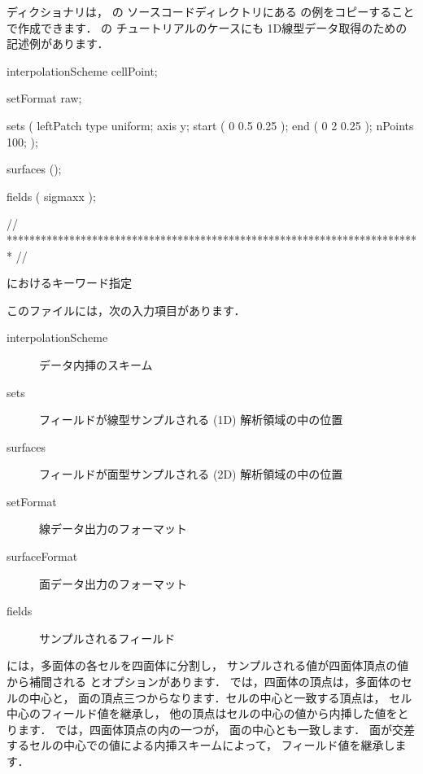 ディクショナリは，
の
ソースコードディレクトリにある
\/の例をコピーすることで作成できます．
\/の
チュートリアルのケースにも
1D線型データ取得のための記述例があります．
\begin{OFverbatim}[file, linenum=17]

interpolationScheme cellPoint;

setFormat       raw;

sets
(
    leftPatch
    {
        type    uniform;
        axis    y;
        start   ( 0 0.5 0.25 );
        end     ( 0 2 0.25 );
        nPoints 100;
    }
);

surfaces        ();

fields          ( sigmaxx );


// ************************************************************************* //
\end{OFverbatim}


\begin{table}[ht]
 
 \caption{におけるキーワード指定}
 \label{tbl:6.3}
\end{table}


このファイルには，次の入力項目があります．
\begin{description}
 \item[interpolationScheme] データ内挿のスキーム
 \item[sets] フィールドが線型サンプルされる (1D) 解析領域の中の位置
 \item[surfaces] フィールドが面型サンプルされる (2D) 解析領域の中の位置
 \item[setFormat] 線データ出力のフォーマット
 \item[surfaceFormat] 面データ出力のフォーマット
 \item[fields] サンプルされるフィールド
\end{description}

には，多面体の各セルを四面体に分割し，
サンプルされる値が四面体頂点の値から補間される
とオプションがあります．
では，四面体の頂点は，多面体のセルの中心と，
面の頂点三つからなります．セルの中心と一致する頂点は，
セル中心のフィールド値を継承し，
他の頂点はセルの中心の値から内挿した値をとります．
では，四面体頂点の内の一つが，
面の中心とも一致します．
面が交差するセルの中心での値による内挿スキームによって，
フィールド値を継承します．


